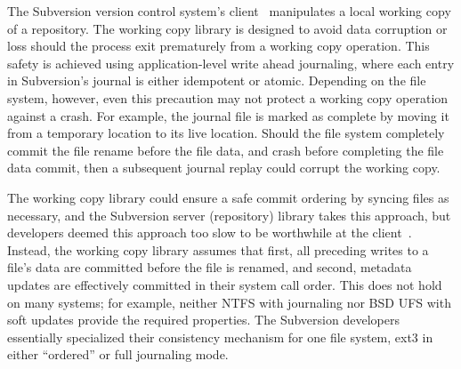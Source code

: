
The Subversion version control system's client~\cite{svn} manipulates a
local working copy of a repository.
%
The working copy library is designed to avoid data corruption or loss
should the process exit prematurely from a working copy operation.
%
This safety is achieved using application-level write ahead journaling,
where each entry in Subversion's journal is either idempotent or
atomic.
%
Depending on the file system, however, even this precaution may not protect
a working copy operation against a crash.
%
For example, the journal file is marked as complete by moving it from
a temporary location to its live location.
%
Should the file system completely commit the file rename before
the file data, and crash before completing the file data commit, then
a subsequent journal replay could corrupt the working copy.

The working copy library could ensure a safe commit ordering by
syncing files as necessary, and the Subversion server (repository) library
takes this approach, but
%
developers deemed this approach too slow to be worthwhile at the
client~\cite{svntradeoff}.
%
Instead, the working copy library assumes that
%
first, all preceding writes to a file's data are committed before the file
is renamed,
%
and second, metadata updates are effectively committed in their system call
order.
%
%
This does not hold on
many systems; for example, neither NTFS with journaling nor BSD UFS with
soft updates provide the required properties.  The Subversion developers
essentially specialized their consistency mechanism for one file system,
ext3 in either ``ordered'' or full journaling mode.
%

